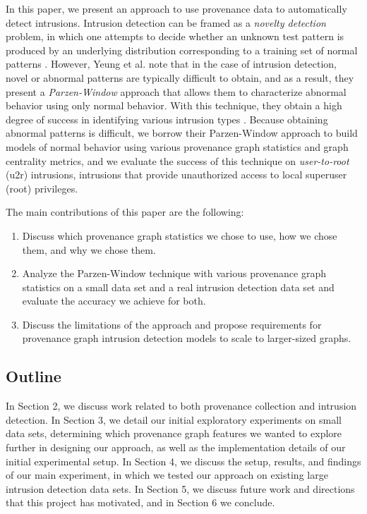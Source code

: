 \documentclass[10pt,twocolumn]{article}
\begin{document}
In this paper, we present an approach to use provenance data to automatically detect intrusions. Intrusion
detection can be framed as a {\em novelty detection} problem, in which one attempts to decide whether
an unknown test pattern is produced by an underlying distribution corresponding to a training set
of normal patterns \cite{parzen}. However, Yeung et al. note that in the case of intrusion detection, novel
or abnormal patterns are typically difficult to obtain, and as a result, they present a {\em Parzen-Window} approach that allows them to characterize abnormal behavior using only normal behavior.
With this technique, they obtain a high degree of success
in identifying various intrusion types \cite{parzen}. Because obtaining abnormal patterns is difficult, 
we borrow their Parzen-Window approach to build models of normal behavior using 
various provenance graph statistics and graph centrality metrics, and we evaluate the success of this technique
on {\em user-to-root} (u2r) intrusions, intrusions that provide unauthorized access to local superuser (root) privileges.

The main contributions of this paper are the following:
\begin{enumerate}
\item Discuss which provenance graph statistics we chose to use, how we chose them, and why we chose them.
\item Analyze the Parzen-Window technique with various provenance graph statistics on a small data set and a real intrusion detection data set and evaluate the accuracy we achieve for both.
\item Discuss the limitations of the approach and propose requirements for provenance graph intrusion detection models to scale to larger-sized graphs.
\end{enumerate}

\subsection{Outline}
In Section 2, we discuss work related to both provenance collection and intrusion detection. In Section 3, we detail our initial exploratory experiments on small data sets, determining which provenance graph features we wanted to explore further in designing our approach, as well as the implementation details of our initial experimental setup. In Section 4, we discuss the setup, results, and findings of our main experiment, in which we tested our approach on existing large intrusion detection data sets. In Section 5, we discuss future work and directions that this project has motivated, and in Section 6 we conclude.
\end{document}
